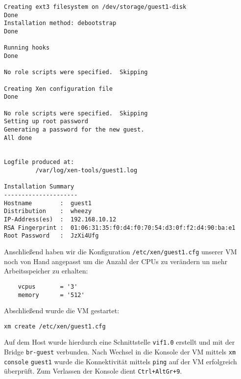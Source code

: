 \begin{verbatim}
Creating ext3 filesystem on /dev/storage/guest1-disk
Done                                              
Installation method: debootstrap
Done

Running hooks
Done

No role scripts were specified.  Skipping

Creating Xen configuration file
Done

No role scripts were specified.  Skipping
Setting up root password
Generating a password for the new guest.
All done


Logfile produced at:
         /var/log/xen-tools/guest1.log

Installation Summary
---------------------
Hostname        :  guest1
Distribution    :  wheezy
IP-Address(es)  :  192.168.10.12 
RSA Fingerprint :  01:06:31:35:f0:d4:f0:70:54:d3:0f:f2:d4:90:ba:e1
Root Password   :  JzXi4Ufg
\end{verbatim}

Anschließend haben wir die Konfiguration \verb#/etc/xen/guest1.cfg# unserer VM noch von Hand angepasst um die Anzahl der CPUs zu verändern un mehr Arbeitsspeicher zu erhalten:
\setupVerbatimOut
\begin{verbatim}
    vcpus       = '3'
    memory      = '512'
\end{verbatim}

Abschließend wurde die VM gestartet:
\begin{verbatim}
xm create /etc/xen/guest1.cfg
\end{verbatim}

Auf dem Host wurde hierdurch eine Schnittstelle \verb#vif1.0# erstellt und mit der Bridge \verb#br-guest# verbunden. Nach Wechsel in die Konsole der VM mittels \verb#xm# \verb#console# \verb#guest1# wurde die Konnektivität mittels \verb#ping# auf der VM erfolgreich überprüft. Zum Verlassen der Konsole dient \verb#Ctrl+AltGr+9#.

